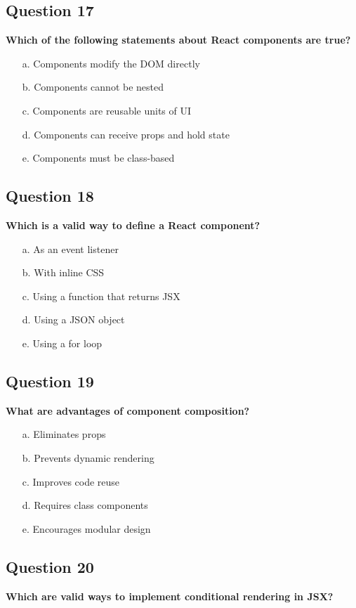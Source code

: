 \documentclass{article}
\begin{document}
\subsection*{Question 17}
\textbf{Which of the following statements about React components are true?}

\begin{itemize}
  \item[a.] Components modify the DOM directly
  \item[b.] Components cannot be nested
  \item[c.] Components are reusable units of UI
  \item[d.] Components can receive props and hold state
  \item[e.] Components must be class-based
\end{itemize}

\subsection*{Question 18}
\textbf{Which is a valid way to define a React component?}

\begin{itemize}
  \item[a.] As an event listener
  \item[b.] With inline CSS
  \item[c.] Using a function that returns JSX
  \item[d.] Using a JSON object
  \item[e.] Using a for loop
\end{itemize}

\subsection*{Question 19}
\textbf{What are advantages of component composition?}

\begin{itemize}
  \item[a.] Eliminates props
  \item[b.] Prevents dynamic rendering
  \item[c.] Improves code reuse
  \item[d.] Requires class components
  \item[e.] Encourages modular design
\end{itemize}

\subsection*{Question 20}
\textbf{Which are valid ways to implement conditional rendering in JSX?}
\end{document}
